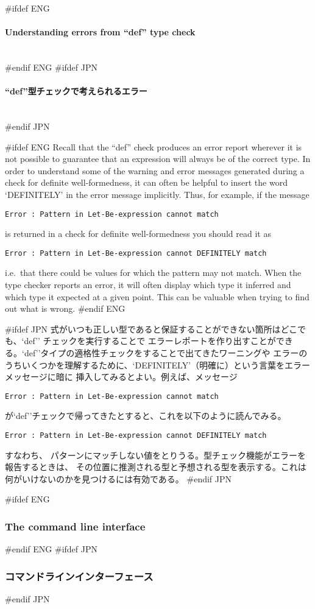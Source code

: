 \documentclass[\pformat,12pt]{article}
\newcommand{\subsubsubsection}[1]{\paragraph{#1}\mbox{}\\}
\begin{document}
#ifdef ENG
\subsubsubsection{Understanding errors from ``def'' type check} 
#endif ENG
#ifdef JPN
\subsubsubsection{``def''型チェックで考えられるエラー} 
#endif JPN

#ifdef ENG
Recall that the ``def'' check produces an error report wherever it is not
possible to guarantee that an expression will always be of the correct type. 
In order to understand some of the warning and error messages
generated during a check for definite well-formedness, it can often be
helpful to  insert the word `DEFINITELY' in the error message
implicitly. Thus, for example, if the message

{\tt Error : Pattern in Let-Be-expression cannot match}

is returned in a check for definite well-formedness you should read it as

{\tt Error : Pattern in Let-Be-expression cannot DEFINITELY match}

i.e.\ that there could be values for which the pattern may not match.
When the type checker reports an error, it will often display which
type it inferred and which type it expected at a given point. This can
be valuable when trying to find out what is wrong.
#endif ENG

#ifdef JPN
式がいつも正しい型であると保証することができない箇所はどこでも、`def'' チェックを実行することで
エラーレポートを作り出すことができる。`def''タイプの適格性チェックをすることで出てきたワーニングや
エラーのうちいくつかを理解するために、`DEFINITELY'（明確に）という言葉をエラーメッセージに暗に
挿入してみるとよい。例えば、メッセージ

{\tt Error : Pattern in Let-Be-expression cannot match}

が`def''チェックで帰ってきたとすると、これを以下のように読んでみる。

{\tt Error : Pattern in Let-Be-expression cannot DEFINITELY match}

すなわち、 パターンにマッチしない値をとりうる。型チェック機能がエラーを報告するときは、
その位置に推測される型と予想される型を表示する。これは何がいけないのかを見つけるには有効である。
#endif JPN

#ifdef ENG
\subsubsection{The command line interface}
#endif ENG
#ifdef JPN
\subsubsection{コマンドラインインターフェース} 
#endif JPN
\end{document}

